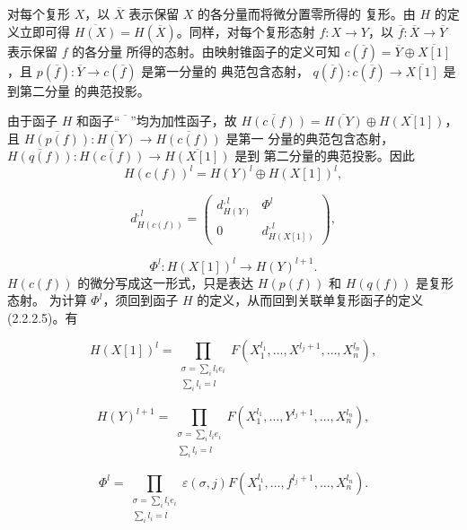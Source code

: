 \clearpage
{}%
\begingroup
\small
\setlength{\abovedisplayskip}{3pt plus 2pt minus 2pt}%
\setlength{\belowdisplayskip}{3pt plus 2pt minus 2pt}%
\setlength{\jot}{2pt}%

对每个复形 $X$，以 $\overline{X}$ 表示保留 $X$ 的各分量而将微分置零所得的
复形。由 $H$ 的定义立即可得
$\overline{H(X)}=H(\overline{X})$。同样，对每个复形态射
$f\colon X\longrightarrow Y$，以
$\overline{f}\colon\overline{X}\longrightarrow\overline{Y}$ 表示保留 $f$ 的各分量
所得的态射。由映射锥函子的定义可知
$c(\overline{f})=\overline{Y}\oplus\overline{X[1]}$，且
$p(\overline{f})\colon\overline{Y}\longrightarrow c(\overline{f})$ 是第一分量的
典范包含态射，
$q(\overline{f})\colon c(\overline{f})\longrightarrow\overline{X[1]}$ 是到第二分量
的典范投影。

由于函子 $H$ 和函子“$\overline{\phantom{X}}$”均为加性函子，故
$\overline{H(c(f))}=\overline{H(Y)}\oplus\overline{H(X[1])}$，且
$\overline{H(p(f))}\colon\overline{H(Y)}\longrightarrow\overline{H(c(f))}$ 是第一
分量的典范包含态射，
$\overline{H(q(f))}\colon\overline{H(c(f))}\longrightarrow\overline{H(X[1])}$ 是到
第二分量的典范投影。因此
\[
  H(c(f))^l=H(Y)^l\oplus H(X[1])^l,
\]

\begin{equation}
  d_{H(c(f))}^{,l}=
  \begin{pmatrix}
    d_{H(Y)}^{,l} & \Phi^l\\
    0 & d_{H(X[1])}^{,l}
  \end{pmatrix},
  \tag{3.4.3.2}
\end{equation}

\[
  \Phi^l\colon H(X[1])^l\longrightarrow H(Y)^{l+1}.
\]
$H(c(f))$ 的微分写成这一形式，只是表达 $H(p(f))$ 和 $H(q(f))$ 是复形态射。
为计算 $\Phi^l$，须回到函子 $H$ 的定义，从而回到关联单复形函子的定义
(2.2.2.5)。有

\[
  H(X[1])^l=
  \prod_{\substack{\sigma=\sum_i l_i e_i\\ \sum_i l_i=l}}
  F(X_1^{l_1},\ldots,X^{l_j+1},\ldots,X_n^{l_n}),
\]

\begin{equation}
  H(Y)^{l+1}=
  \prod_{\substack{\sigma=\sum_i l_i e_i\\ \sum_i l_i=l}}
  F(X_1^{l_1},\ldots,Y^{l_j+1},\ldots,X_n^{l_n}),
  \tag{3.4.3.3}
\end{equation}

\[
  \Phi^l=
  \prod_{\substack{\sigma=\sum_i l_i e_i\\ \sum_i l_i=l}}
  \varepsilon(\sigma,j)
  F(X_1^{l_1},\ldots,f^{l_j+1},\ldots,X_n^{l_n}).
\]
\endgroup
